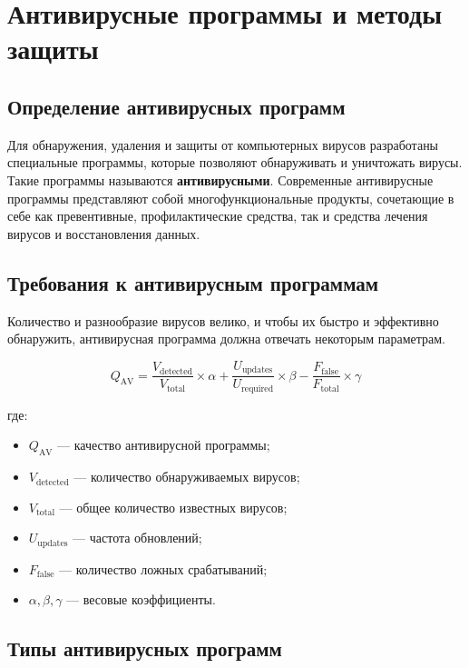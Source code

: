 \section{Антивирусные программы и методы защиты}
 
\subsection{Определение антивирусных программ}
 
Для обнаружения, удаления и защиты от компьютерных вирусов разработаны специальные программы, которые позволяют обнаруживать и уничтожать вирусы. Такие программы называются \textbf{антивирусными}. Современные антивирусные программы представляют собой многофункциональные продукты, сочетающие в себе как превентивные, профилактические средства, так и средства лечения вирусов и восстановления данных.
 
\subsection{Требования к антивирусным программам}
 
Количество и разнообразие вирусов велико, и чтобы их быстро и эффективно обнаружить, антивирусная программа должна отвечать некоторым параметрам.
 
\begin{equation} \label{eq:antivirus_quality}
    Q_{\text{AV}} = \frac{V_{\text{detected}}}{V_{\text{total}}} \times \alpha + \frac{U_{\text{updates}}}{U_{\text{required}}} \times \beta - \frac{F_{\text{false}}}{F_{\text{total}}} \times \gamma
\end{equation}
 
где:
\begin{itemize}
    \item \(Q_{\text{AV}}\) — качество антивирусной программы;
    \item \(V_{\text{detected}}\) — количество обнаруживаемых вирусов;
    \item \(V_{\text{total}}\) — общее количество известных вирусов;
    \item \(U_{\text{updates}}\) — частота обновлений;
    \item \(F_{\text{false}}\) — количество ложных срабатываний;
    \item \(\alpha, \beta, \gamma\) — весовые коэффициенты.
\end{itemize}
 
\subsection{Типы антивирусных программ}
 
